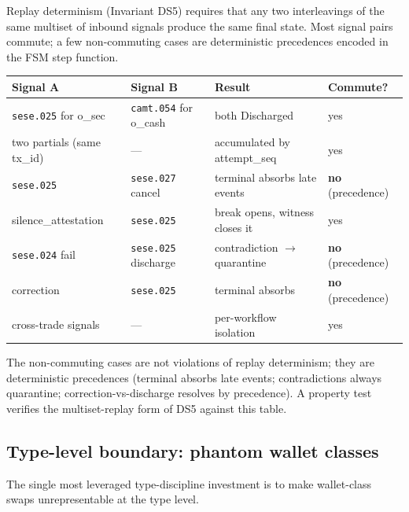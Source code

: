 \documentclass[11pt,a4paper]{article}
\begin{document}
Replay determinism (Invariant DS5) requires that any two interleavings of the same multiset of inbound signals produce the same final state. Most signal pairs commute; a few non-commuting cases are deterministic precedences encoded in the FSM step function.

\begin{table}[h]
\centering
\begin{small}
\begin{tabular}{p{3.5cm}p{3.5cm}p{2.5cm}p{2.0cm}}
\toprule
\textbf{Signal A} & \textbf{Signal B} & \textbf{Result} & \textbf{Commute?} \\
\midrule
\texttt{sese.025} for o\_sec & \texttt{camt.054} for o\_cash & both Discharged & yes \\
two partials (same tx\_id) & --- & accumulated by attempt\_seq & yes \\
\texttt{sese.025} & \texttt{sese.027} cancel & terminal absorbs late events & \textbf{no} (precedence) \\
silence\_attestation & \texttt{sese.025} & break opens, witness closes it & yes \\
\texttt{sese.024} fail & \texttt{sese.025} discharge & contradiction $\to$ quarantine & \textbf{no} (precedence) \\
correction & \texttt{sese.025} & terminal absorbs & \textbf{no} (precedence) \\
cross-trade signals & --- & per-workflow isolation & yes \\
\bottomrule
\end{tabular}
\end{small}
\end{table}

The non-commuting cases are not violations of replay determinism; they are deterministic precedences (terminal absorbs late events; contradictions always quarantine; correction-vs-discharge resolves by precedence). A property test verifies the multiset-replay form of DS5 against this table.

\subsection{Type-level boundary: phantom wallet classes}
\label{sec:implementation-types}

The single most leveraged type-discipline investment is to make wallet-class swaps unrepresentable at the type level.
\end{document}
